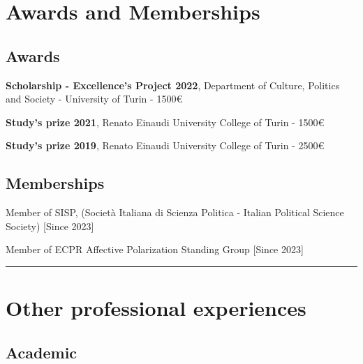 \documentclass[8pt,]{article}
\providecommand{\tightlist}{%
  \setlength{\itemsep}{0pt}\setlength{\parskip}{0pt}}
\renewenvironment{itemize}{
  \begin{list}{}{
    \setlength{\leftmargin}{1.5em}
  }
}{
  \end{list}
}
\begin{document}
\hypertarget{awards-and-memberships}{%
\section{Awards and Memberships}\label{awards-and-memberships}}

\hypertarget{awards}{%
\subsection{Awards}\label{awards}}

\begin{itemize}
\tightlist
\item
  \textbf{Scholarship - Excellence's Project 2022}, Department of
  Culture, Politics and Society - University of Turin - 1500€
\item
  \textbf{Study's prize 2021}, Renato Einaudi University College of
  Turin - 1500€
\item
  \textbf{Study's prize 2019}, Renato Einaudi University College of
  Turin - 2500€
\end{itemize}

\hypertarget{memberships}{%
\subsection{Memberships}\label{memberships}}

\begin{itemize}
\item
  Member of SISP, (Società Italiana di Scienza Politica - Italian
  Political Science Society) {[}Since 2023{]}
\item
  Member of ECPR Affective Polarization Standing Group {[}Since 2023{]}

  \bigskip \hrule
\end{itemize}

\hypertarget{other-professional-experiences}{%
\section{Other professional
experiences}\label{other-professional-experiences}}

\hypertarget{academic}{%
\subsection{Academic}\label{academic}}
\end{document}
